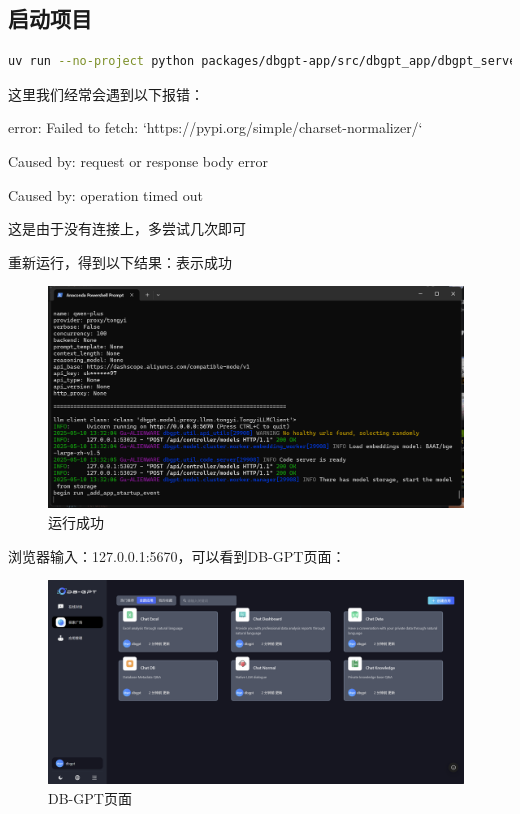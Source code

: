 \documentclass{article}
\begin{document}
	\subsection{启动项目}
	
	\begin{lstlisting}[language=bash, title=uv安装, tabsize=4]
		uv run --no-project python packages/dbgpt-app/src/dbgpt_app/dbgpt_server.py --config configs/dbgpt-proxy-tongyi.toml
	\end{lstlisting}
	
	这里我们经常会遇到以下报错：
	
	\begin{tcolorbox}[colback = red!25!white, colframe = red!75!black]
		error: Failed to fetch: `https://pypi.org/simple/charset-normalizer/`
		
		Caused by: request or response body error
		
		Caused by: operation timed out
	\end{tcolorbox}
	
	
	这是由于没有连接上，多尝试几次即可
	
	重新运行，得到以下结果：表示成功
	
	\begin{figure}[H]
		\centering
		\includegraphics[width=11cm]{./images/16.运行成功.png}
		\caption{运行成功}
	\end{figure}
	
	浏览器输入：127.0.0.1:5670，可以看到DB-GPT页面：
	
	\begin{figure}[H]
		\centering
		\includegraphics[width=11cm]{./images/17.DB-GPT页面.png}
		\caption{DB-GPT页面}
	\end{figure}
	
\end{document}
